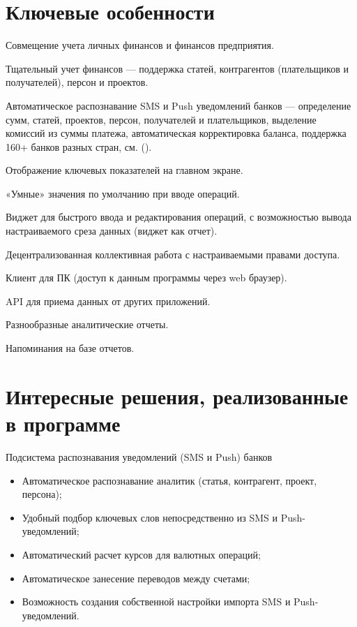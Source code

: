 \documentclass[a4paper,10pt,russian]{sphinxmanual}
\begin{document}
\section{Ключевые особенности}
\label{\detokenize{about:id2}}
Совмещение учета личных финансов и финансов предприятия.

Тщательный учет финансов — поддержка статей, контрагентов (плательщиков и получателей), персон и проектов.

Автоматическое распознавание SMS и Push уведомлений банков — определение сумм, статей, проектов, персон,
получателей и плательщиков, выделение комиссий из суммы платежа, автоматическая корректировка баланса,
поддержка 160+ банков разных стран, см. {\hyperref[\detokenize{banks:chapter-supported-banks}]{}} ().

Отображение ключевых показателей на главном экране.

«Умные» значения по умолчанию при вводе операций.

Виджет для быстрого ввода и редактирования операций, с возможностью вывода настраиваемого среза данных (виджет как отчет).

Децентрализованная коллективная работа с настраиваемыми правами доступа.

Клиент для ПК (доступ к данным программы через web браузер).

API для приема данных от других приложений.

Разнообразные аналитические отчеты.

Напоминания на базе отчетов.


\section{Интересные решения, реализованные в программе}
\label{\detokenize{about:id3}}
Подсистема распознавания уведомлений (SMS и Push) банков
\begin{itemize}
\item {} 
Автоматическое распознавание аналитик (статья, контрагент, проект, персона);

\item {} 
Удобный подбор ключевых слов непосредственно из SMS и Push-уведомлений;

\item {} 
Автоматический расчет курсов для валютных операций;

\item {} 
Автоматическое занесение переводов между счетами;

\item {} 
Возможность создания собственной настройки импорта SMS и Push-уведомлений.

\end{itemize}
\end{document}
